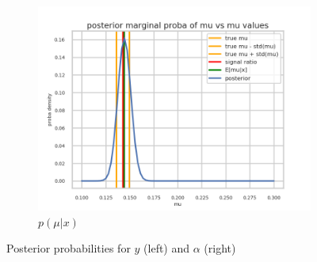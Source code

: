\begin{figure}[htb]
  \begin{subfigure}[t]{0.49\linewidth}
    \includegraphics[width=\linewidth]{s3d2/marginal_mu.png}
    \caption{$p(\mu|x)$}
    \label{fig:marginal_mu}
  \end{subfigure}
  \caption{Posterior probabilities for $y$ (left) and $\alpha$ (right)}
  \label{fig:marginals}
\end{figure}



